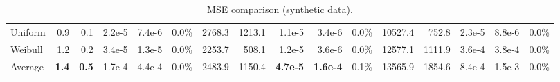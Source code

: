 \begin{table}[H]
{\begin{tabular}{l rr rr c rr rr c rr rr c}
        Uniform            & 0.9 & 0.1 & 2.2e-5 & 7.4e-6 & 0.0\% & 2768.3 & 1213.1 & 1.1e-5 & 3.4e-6 & 0.0\% & 10527.4 & 752.8 & 2.3e-5 & 8.8e-6 & 0.0\% \\
        Weibull            & 1.2 & 0.2 & 3.4e-5 & 1.3e-5 & 0.0\% & 2253.7 & 508.1 & 1.2e-5 & 3.6e-6 & 0.0\% & 12577.1 & 1111.9 & 3.6e-4 & 3.8e-4 & 0.0\% \\
        \midrule
        Average            & \textbf{1.4} & \textbf{0.5} & 1.7e-4 & 4.4e-4 & 0.0\% & 2483.9 & 1150.4 & \textbf{4.7e-5} & \textbf{1.6e-4} & 0.1\% & 13565.9 & 1854.6 & 8.4e-4 & 1.5e-3 & 0.0\% \\
        \bottomrule
    \end{tabular}}
    \caption{MSE comparison (synthetic data).}
    \label{tab:syntheticmse}
\end{table}
